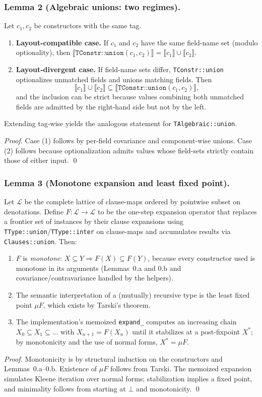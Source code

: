 \documentclass[11pt]{article}
\begin{document}
\subsubsection*{Lemma 2 (Algebraic unions: two regimes).}
Let $c_1, c_2$ be constructors with the same tag.
\begin{enumerate}[leftmargin=*]
  \item \textbf{Layout-compatible case.} If $c_1$ and $c_2$ have the same field-name set (modulo optionality), then $\llbracket \texttt{TConstr::union}(c_1,c_2) \rrbracket = \llbracket c_1 \rrbracket \cup \llbracket c_2 \rrbracket$.
  \item \textbf{Layout-divergent case.} If field-name sets differ, \texttt{TConstr::union} optionalizes unmatched fields and unions matching fields. Then
  \[
  \llbracket c_1 \rrbracket \cup \llbracket c_2 \rrbracket \subseteq \llbracket \texttt{TConstr::union}(c_1,c_2) \rrbracket,
  \]
  and the inclusion can be strict because values combining both unmatched fields are admitted by the right-hand side but not by the left.
\end{enumerate}
Extending tag-wise yields the analogous statement for \texttt{TAlgebraic::union}.

\emph{Proof.}
Case (1) follows by per-field covariance and component-wise unions. Case (2) follows because optionalization admits values whose field-sets strictly contain those of either input. \qed

\subsubsection*{Lemma 3 (Monotone expansion and least fixed point).}
Let $\mathcal{L}$ be the complete lattice of clause-maps ordered by pointwise subset on denotations. Define $F:\mathcal{L}\to\mathcal{L}$ to be the one-step expansion operator that replaces a frontier set of instances by their clause expansions using \texttt{TType::union}/\texttt{TType::inter} on clause-maps and accumulates results via \texttt{Clauses::union}. Then:
\begin{enumerate}[leftmargin=*]
  \item $F$ is \emph{monotone}: $X\subseteq Y \Rightarrow F(X)\subseteq F(Y)$, because every constructor used is monotone in its arguments (Lemmas~0.a and 0.b and covariance/contravariance handled by the helpers).
  \item The semantic interpretation of a (mutually) recursive type is the least fixed point $\mu F$, which exists by Tarski's theorem.
  \item The implementation's memoized \texttt{expand\_} computes an increasing chain $X_0\subseteq X_1\subseteq \dots$ with $X_{n+1}=F(X_n)$ until it stabilizes at a post-fixpoint $X^*$; by monotonicity and the use of normal forms, $X^*=\mu F$.
\end{enumerate}
\emph{Proof.}
Monotonicity is by structural induction on the constructors and Lemmas~0.a–0.b. Existence of $\mu F$ follows from Tarski. The memoized expansion simulates Kleene iteration over normal forms; stabilization implies a fixed point, and minimality follows from starting at $\bot$ and monotonicity. \qed
\end{document}
